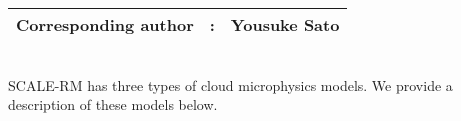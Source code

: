 {\bf \Large
\begin{tabular}{ccc}
\hline
  Corresponding author & : & Yousuke Sato\\
\hline
\end{tabular}
}
\\
SCALE-RM has three types of cloud microphysics models. We provide a description of these models below.

